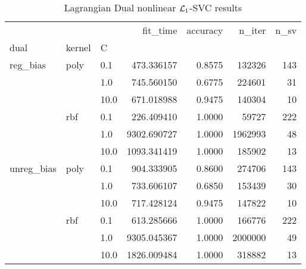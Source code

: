 \begin{table}[H]
\centering
\caption{Lagrangian Dual nonlinear $\protect \mathcal{L}_1$-SVC results}
\label{nonlinear_lagrangian_dual_l1_svc_cv_results}
\begin{tabular}{lllrrrr}
\toprule
           &     &      &     fit\_time &  accuracy &   n\_iter &  n\_sv \\
dual & kernel & C &              &           &          &       \\
\midrule
reg\_bias & poly & 0.1  &   473.336157 &    0.8575 &   132326 &   143 \\
           &     & 1.0  &   745.560150 &    0.6775 &   224601 &    31 \\
           &     & 10.0 &   671.018988 &    0.9475 &   140304 &    10 \\
           & rbf & 0.1  &   226.409410 &    1.0000 &    59727 &   222 \\
           &     & 1.0  &  9302.690727 &    1.0000 &  1962993 &    48 \\
           &     & 10.0 &  1093.341419 &    1.0000 &   185902 &    13 \\
unreg\_bias & poly & 0.1  &   904.333905 &    0.8600 &   274706 &   143 \\
           &     & 1.0  &   733.606107 &    0.6850 &   153439 &    30 \\
           &     & 10.0 &   717.428124 &    0.9475 &   147822 &    10 \\
           & rbf & 0.1  &   613.285666 &    1.0000 &   166776 &   222 \\
           &     & 1.0  &  9305.045367 &    1.0000 &  2000000 &    49 \\
           &     & 10.0 &  1826.009484 &    1.0000 &   318882 &    13 \\
\bottomrule
\end{tabular}
\end{table}
